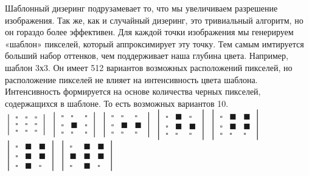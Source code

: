 Шаблонный дизеринг подрузамевает то, что мы увеличиваем разрешение изображения. Так же, как и случайный дизеринг, это тривиальный алгоритм, но он гораздо более эффективен.\cite{Ulich}
Для каждой точки изображения мы генерируем «шаблон» пикселей, который аппроксимирует эту точку. Тем  самым  имтируется больший набор оттенков, чем поддерживает наша глубина цвета.
Например, шаблон 3х3. Он имеет 512 вариантов возможных расположений пикселей, но расположение пикселей не влияет на интенсивность цвета шаблона. Интенсивность формируется на основе количества черных пикселей, содержащихся в шаблоне. То есть возможных вариантов 10. \\

$\begin{vmatrix}
\square&\square&\square \\
\square &\square&\square \\
\square &\square&\square 
\end{vmatrix}$
$\begin{vmatrix}
\square&\square&\square \\
\square &\blacksquare&\square \\
\square &\square&\square 
\end{vmatrix}$ 
$\begin{vmatrix}
\square&\square&\square \\
\square &\blacksquare&\blacksquare \\
\square &\square&\square 
\end{vmatrix}$ 
$\begin{vmatrix}
\square&\blacksquare&\square \\
\square &\blacksquare&\blacksquare \\
\square &\square&\square 
\end{vmatrix}$ 
$\begin{vmatrix}
\square&\blacksquare&\blacksquare \\
\square &\blacksquare&\blacksquare \\
\square &\square&\square 
\end{vmatrix}$ 
$\begin{vmatrix}
\square&\blacksquare&\blacksquare \\
\square &\blacksquare&\blacksquare \\
\square &\blacksquare&\square 
\end{vmatrix}$ 
$\begin{vmatrix}
\square&\blacksquare&\blacksquare \\
\blacksquare &\blacksquare&\blacksquare \\
\square &\blacksquare&\square 
\end{vmatrix}$ 

